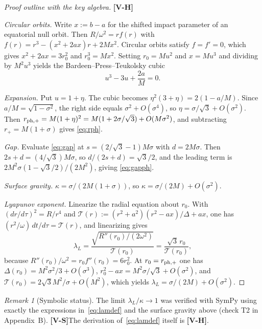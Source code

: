 \documentclass[11pt, a4paper]{article}
\newcommand{\VS}{\textcolor{vs}{\textbf{[V-S]}}}
\newcommand{\VH}{\textcolor{vh}{\textbf{[V-H]}}}
\theoremstyle{remark}
\newtheorem{remark}[theorem]{Remark}
\theoremstyle{definition}
\begin{document}
\begin{proof}[Proof outline with the key algebra]
\VH

\emph{Circular orbits.} Write $x := b - a$ for the shifted impact parameter of an equatorial null orbit. Then $R/\omega^2 = r f(r)$ with $f(r) = r^3 - (x^2+2ax)r + 2Mx^2$. Circular orbits satisfy $f = f' = 0$, which gives $x^2 + 2ax = 3r_0^2$ and $r_0^3 = Mx^2$. Setting $r_0 = Mu^2$ and $x = Mu^3$ and dividing by $M^2u^3$ yields the Bardeen--Press--Teukolsky cubic
\[
u^3 - 3u + \frac{2a}{M} = 0.
\]

\emph{Expansion.} Put $u = 1+\eta$. The cubic becomes $\eta^2(3+\eta) = 2(1 - a/M)$. Since $a/M = \sqrt{1-\sigma^2}$, the right side equals $\sigma^2 + O(\sigma^4)$, so $\eta = \sigma/\sqrt3 + O(\sigma^2)$. Then $r_{{\rm ph},+} = M(1+\eta)^2 = M(1 + 2\sigma/\sqrt3) + O(M\sigma^2)$, and subtracting $r_+ = M(1+\sigma)$ gives \eqref{eq:rph}.

\emph{Gap.} Evaluate \eqref{eq:gap} at $s = (2/\sqrt3-1)M\sigma$ with $d = 2M\sigma$. Then $2s+d = (4/\sqrt3)M\sigma$, so $d/(2s+d) = \sqrt3/2$, and the leading term is $2M^2\sigma(1-\sqrt3/2)/(2M^2)$, giving \eqref{eq:gapph}.

\emph{Surface gravity.} $\kappa = \sigma/(2M(1+\sigma))$, so $\kappa = \sigma/(2M) + O(\sigma^2)$.

\emph{Lyapunov exponent.} Linearize the radial equation about $r_0$. With $(dr/d\tau)^2 = R/r^4$ and $\mathcal{T}(r) := (r^2+a^2)(r^2-ax)/\Delta + ax$, one has $(r^2/\omega)\,dt/d\tau = \mathcal{T}(r)$, and linearizing gives
\begin{equation}
\lambda_L = \frac{\sqrt{R''(r_0)/(2\omega^2)}}{\mathcal{T}(r_0)} = \frac{\sqrt3\, r_0}{\mathcal{T}(r_0)}, \label{eq:lamdef}
\end{equation}
because $R''(r_0)/\omega^2 = r_0 f''(r_0) = 6r_0^2$. At $r_0 = r_{{\rm ph},+}$ one has $\Delta(r_0) = M^2\sigma^2/3 + O(\sigma^3)$, $r_0^2 - ax = M^2\sigma/\sqrt3 + O(\sigma^2)$, and $\mathcal{T}(r_0) = 2\sqrt3 M^2/\sigma + O(M^2)$, which yields $\lambda_L = \sigma/(2M) + O(\sigma^2)$. \qedhere
\end{proof}

\begin{remark}[Symbolic status]
The limit $\lambda_L/\kappa \to 1$ was verified with SymPy using exactly the expressions in~\eqref{eq:lamdef} and the surface gravity above (check T2 in Appendix~B). \VS The derivation of~\eqref{eq:lamdef} itself is \VH.
\end{remark}
\end{document}
